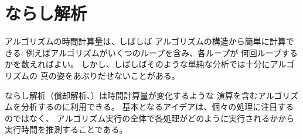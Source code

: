 \begin{comment}
\chapter{Amortized analysis}

\index{amortized analysis}

The time complexity of an algorithm
is often easy to analyze
just by examining the structure
of the algorithm:
what loops does the algorithm contain
and how many times the loops are performed.
However, sometimes a straightforward analysis
does not give a true picture of the efficiency of the algorithm.

\key{Amortized analysis} can be used to analyze
algorithms that contain operations whose
time complexity varies.
The idea is to estimate the total time used to
all such operations during the
execution of the algorithm, instead of focusing
on individual operations.
\end{comment}

\chapter{ならし解析}


アルゴリズムの時間計算量は、しばしば
アルゴリズムの構造から簡単に計算できる:
例えばアルゴリズムがいくつのループを含み、各ループが
何回ループするかを数えればよい。
しかし、しばしばそのような単純な分析では十分にアルゴリズムの
真の姿をあぶりだせないことがある。

ならし解析（償却解析、）は時間計算量が変化するような
演算を含むアルゴリズムを分析するのに利用できる。
基本となるアイデアは、個々の処理に注目するのではなく、
アルゴリズム実行の全体で各処理がどのように実行されるかから
実行時間を推測することである。

\begin{comment}
\section{Two pointers method}

\index{two pointers method}

In the \key{two pointers method},
two pointers are used to
iterate through the array values.
Both pointers can move to one direction only,
which ensures that the algorithm works efficiently.
Next we discuss two problems that can be solved
using the two pointers method.
\end{comment}

